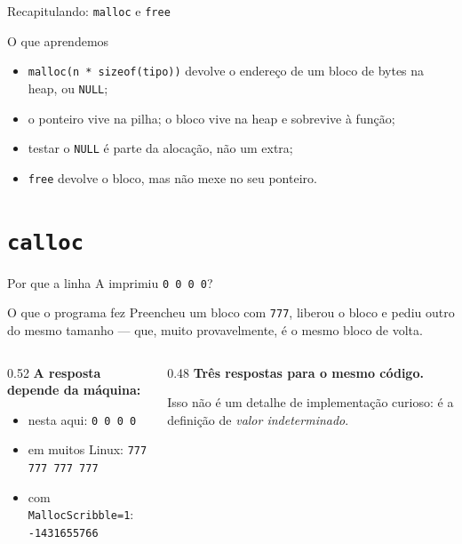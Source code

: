\documentclass[aspectratio=169]{beamer}
\begin{document}
\begin{frame}{Recapitulando: \texttt{malloc} e \texttt{free}}
  \begin{block}{O que aprendemos}
    \begin{itemize}
      \item \texttt{malloc(n * sizeof(tipo))} devolve o endereço de um bloco de
        bytes na heap, ou \texttt{NULL};
      \item o ponteiro vive na pilha; o bloco vive na heap e sobrevive à função;
      \item testar o \texttt{NULL} é parte da alocação, não um extra;
      \item \texttt{free} devolve o bloco, mas não mexe no seu ponteiro.
    \end{itemize}
  \end{block}
\end{frame}

\section{\texttt{calloc}}

\begin{frame}{Por que a linha A imprimiu \texttt{0 0 0 0}?}
  \begin{block}{O que o programa fez}
    Preencheu um bloco com \texttt{777}, liberou o bloco e pediu outro do mesmo
    tamanho --- que, muito provavelmente, é o mesmo bloco de volta.
  \end{block}
  \begin{columns}[T]
    \begin{column}{0.52\textwidth}
      \textbf{A resposta depende da máquina:}
      \begin{itemize}
        \item nesta aqui: \texttt{0 0 0 0}
        \item em muitos Linux: \texttt{777 777 777 777}
        \item com \texttt{MallocScribble=1}: \texttt{-1431655766}
      \end{itemize}
    \end{column}
    \begin{column}{0.48\textwidth}
      \textbf{Três respostas para o mesmo código.}

      \medskip
      Isso não é um detalhe de implementação curioso: é a definição de
      \emph{valor indeterminado}.
    \end{column}
  \end{columns}
\end{frame}
\end{document}
